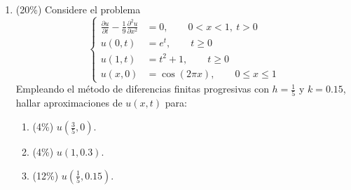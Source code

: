 \documentclass[11pt]{article}
\begin{document}
\begin{enumerate}
\begin{enumerate}
\vspace{5cm}
\end{enumerate}

\item{} (20\%) Considere el problema
\[
\left\{
\begin{aligned}
\frac{\partial u}{\partial t} - \frac{1}{9}\frac{\partial^2 u}{\partial x^2} &= 0, \qquad 0<x<1,\ t>0\\
u(0,t) &= e^t, \qquad t\geq 0\\
u(1,t) &= t^2+1, \qquad t\geq 0\\
u(x,0) &= \cos(2\pi x), \qquad 0\leq x\leq 1
\end{aligned}
\right.
\]
\noindent Empleando el método de diferencias finitas progresivas con $h=\frac{1}{5}$ y $k=0.15$, hallar aproximaciones de $u(x,t)$ para:
\begin{enumerate}
\item{} (4\%) $u\left(\frac{3}{5},0\right)$.
\item{} (4\%) $u(1,0.3)$.
\item{} (12\%) $u\left(\frac{1}{5},0.15\right)$.
\end{enumerate}

\vspace{6cm}
\end{enumerate}

\examfooter
\end{document}
